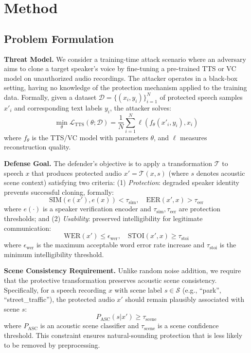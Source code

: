 \section{Method}

\subsection{Problem Formulation}

\textbf{Threat Model.}
We consider a training-time attack scenario where an adversary aims to clone a target speaker's voice by fine-tuning a pre-trained TTS or VC model on unauthorized audio recordings. The attacker operates in a black-box setting, having no knowledge of the protection mechanism applied to the training data. Formally, given a dataset $\mathcal{D} = \{(x_i, y_i)\}_{i=1}^N$ of protected speech samples $x'_i$ and corresponding text labels $y_i$, the attacker solves:
\begin{equation}
\min_{\theta} \mathcal{L}_{\text{TTS}}(\theta; \mathcal{D}) = \frac{1}{N} \sum_{i=1}^N \ell(f_\theta(x'_i, y_i), x_i)
\end{equation}
where $f_\theta$ is the TTS/VC model with parameters $\theta$, and $\ell$ measures reconstruction quality.

\textbf{Defense Goal.}
The defender's objective is to apply a transformation $\mathcal{T}$ to speech $x$ that produces protected audio $x' = \mathcal{T}(x, s)$ (where $s$ denotes acoustic scene context) satisfying two criteria: (1) \textit{Protection}: degraded speaker identity prevents successful cloning, formally:
\begin{equation}
\text{SIM}(e(x'), e(x)) < \tau_{\text{sim}}, \quad \text{EER}(x', x) > \tau_{\text{eer}}
\end{equation}
where $e(\cdot)$ is a speaker verification encoder and $\tau_{\text{sim}}, \tau_{\text{eer}}$ are protection thresholds; and (2) \textit{Usability}: preserved intelligibility for legitimate communication:
\begin{equation}
\text{WER}(x') \leq \epsilon_{\text{wer}}, \quad \text{STOI}(x', x) \geq \tau_{\text{stoi}}
\end{equation}
where $\epsilon_{\text{wer}}$ is the maximum acceptable word error rate increase and $\tau_{\text{stoi}}$ is the minimum intelligibility threshold.

\textbf{Scene Consistency Requirement.}
Unlike random noise addition, we require that the protective transformation preserves acoustic scene consistency. Specifically, for a speech recording $x$ with scene label $s \in \mathcal{S}$ (e.g., ``park'', ``street\_traffic''), the protected audio $x'$ should remain plausibly associated with scene $s$:
\begin{equation}
P_{\text{ASC}}(s | x') \geq \tau_{\text{scene}}
\end{equation}
where $P_{\text{ASC}}$ is an acoustic scene classifier and $\tau_{\text{scene}}$ is a scene confidence threshold. This constraint ensures natural-sounding protection that is less likely to be removed by preprocessing.


